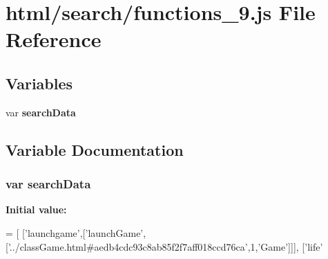 \section{html/search/functions\-\_\-9.js File Reference}
\label{functions__9_8js}
\subsection*{Variables}
\begin{DoxyCompactItemize}
\item 
var {\bf search\-Data}
\end{DoxyCompactItemize}


\subsection{Variable Documentation}
\subsubsection[{search\-Data}]{\setlength{\rightskip}{0pt plus 5cm}var search\-Data}\label{functions__9_8js_ad01a7523f103d6242ef9b0451861231e}
{\bfseries Initial value\-:}
\begin{DoxyCode}
=
[
  [\textcolor{stringliteral}{'launchgame'},[\textcolor{stringliteral}{'launchGame'},[\textcolor{stringliteral}{'../classGame.html#aedb4cdc93c8ab85f2f7aff018ccd76ca'},1,\textcolor{stringliteral}{'Game'}]]],
  [\textcolor{stringliteral}{'life'}
\end{DoxyCode}

